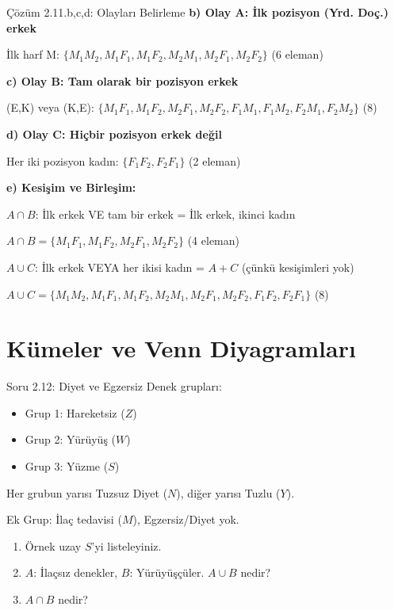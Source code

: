 \documentclass[light]{lutbeamer}
\begin{document}
\begin{frame}{Çözüm 2.11.b,c,d: Olayları Belirleme}
    \color{blue}
    \footnotesize
    \textbf{b) Olay A: İlk pozisyon (Yrd. Doç.) erkek}
    
    İlk harf M: $\{M_1M_2, M_1F_1, M_1F_2, M_2M_1, M_2F_1, M_2F_2\}$ (6 eleman)
    
    \vspace{0.2cm}
    \textbf{c) Olay B: Tam olarak bir pozisyon erkek}
    
    (E,K) veya (K,E): $\{M_1F_1, M_1F_2, M_2F_1, M_2F_2, F_1M_1, F_1M_2, F_2M_1, F_2M_2\}$ (8)
    
    \vspace{0.2cm}
    \textbf{d) Olay C: Hiçbir pozisyon erkek değil}
    
    Her iki pozisyon kadın: $\{F_1F_2, F_2F_1\}$ (2 eleman)
    
    \vspace{0.3cm}
    \textbf{e) Kesişim ve Birleşim:}
    
    $A \cap B$: İlk erkek VE tam bir erkek = İlk erkek, ikinci kadın
    
    $A \cap B = \{M_1F_1, M_1F_2, M_2F_1, M_2F_2\}$ (4 eleman)
    
    \vspace{0.2cm}
    $A \cup C$: İlk erkek VEYA her ikisi kadın = $A + C$ (çünkü kesişimleri yok)
    
    $A \cup C = \{M_1M_2, M_1F_1, M_1F_2, M_2M_1, M_2F_1, M_2F_2, F_1F_2, F_2F_1\}$ (8)
\end{frame}

\section{Kümeler ve Venn Diyagramları}

\begin{frame}{Soru 2.12: Diyet ve Egzersiz}
    Denek grupları:
    \begin{itemize}
        \item Grup 1: Hareketsiz ($Z$)
        \item Grup 2: Yürüyüş ($W$)
        \item Grup 3: Yüzme ($S$)
    \end{itemize}
    Her grubun yarısı Tuzsuz Diyet ($N$), diğer yarısı Tuzlu ($Y$).
    
    Ek Grup: İlaç tedavisi ($M$), Egzersiz/Diyet yok.
    
    \begin{enumerate}
        \item Örnek uzay $S$'yi listeleyiniz.
        \item $A$: İlaçsız denekler, $B$: Yürüyüşçüler. $A \cup B$ nedir?
        \item $A \cap B$ nedir?
    \end{enumerate}
\end{frame}
\end{document}
